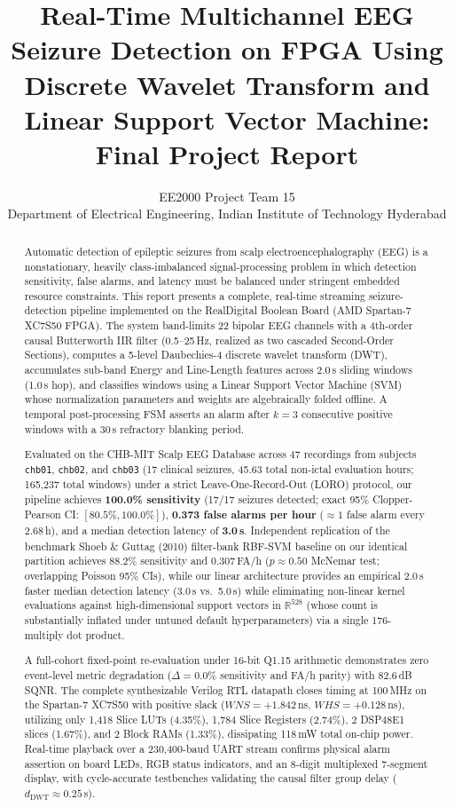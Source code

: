 \documentclass[10pt,twocolumn,letterpaper]{article}
\title{Real-Time Multichannel EEG Seizure Detection on FPGA Using Discrete Wavelet Transform and Linear Support Vector Machine: Final Project Report}
\author{EE2000 Project Team 15\\[2pt]
Department of Electrical Engineering, Indian Institute of Technology Hyderabad}
\begin{document}
\maketitle

\begin{abstract}
Automatic detection of epileptic seizures from scalp electroencephalography (EEG) is a nonstationary, heavily class-imbalanced signal-processing problem in which detection sensitivity, false alarms, and latency must be balanced under stringent embedded resource constraints. This report presents a complete, real-time streaming seizure-detection pipeline implemented on the RealDigital Boolean Board (AMD Spartan-7 XC7S50 FPGA). The system band-limits 22 bipolar EEG channels with a 4th-order causal Butterworth IIR filter (0.5--25\,Hz, realized as two cascaded Second-Order Sections), computes a 5-level Daubechies-4 discrete wavelet transform (DWT), accumulates sub-band Energy and Line-Length features across 2.0\,s sliding windows (1.0\,s hop), and classifies windows using a Linear Support Vector Machine (SVM) whose normalization parameters and weights are algebraically folded offline. A temporal post-processing FSM asserts an alarm after $k=3$ consecutive positive windows with a 30\,s refractory blanking period.

Evaluated on the CHB-MIT Scalp EEG Database across 47 recordings from subjects \texttt{chb01}, \texttt{chb02}, and \texttt{chb03} (17 clinical seizures, 45.63 total non-ictal evaluation hours; 165,237 total windows) under a strict Leave-One-Record-Out (LORO) protocol, our pipeline achieves \textbf{100.0\% sensitivity} (17/17 seizures detected; exact 95\% Clopper-Pearson CI: $[80.5\%, 100.0\%]$), \textbf{0.373 false alarms per hour} ($\approx 1$ false alarm every 2.68\,h), and a median detection latency of \textbf{3.0\,s}. Independent replication of the benchmark Shoeb \& Guttag (2010) filter-bank RBF-SVM baseline on our identical partition achieves 88.2\% sensitivity and 0.307\,FA/h ($p \approx 0.50$ McNemar test; overlapping Poisson 95\% CIs), while our linear architecture provides an empirical 2.0\,s faster median detection latency (3.0\,s vs.\ 5.0\,s) while eliminating non-linear kernel evaluations against high-dimensional support vectors in $\mathbb{R}^{528}$ (whose count is substantially inflated under untuned default hyperparameters) via a single 176-multiply dot product.

A full-cohort fixed-point re-evaluation under 16-bit Q1.15 arithmetic demonstrates zero event-level metric degradation ($\Delta = 0.0\%$ sensitivity and FA/h parity) with 82.6\,dB SQNR. The complete synthesizable Verilog RTL datapath closes timing at 100\,MHz on the Spartan-7 XC7S50 with positive slack ($WNS = +1.842$\,ns, $WHS = +0.128$\,ns), utilizing only 1,418 Slice LUTs (4.35\%), 1,784 Slice Registers (2.74\%), 2 DSP48E1 slices (1.67\%), and 2 Block RAMs (1.33\%), dissipating 118\,mW total on-chip power. Real-time playback over a 230,400-baud UART stream confirms physical alarm assertion on board LEDs, RGB status indicators, and an 8-digit multiplexed 7-segment display, with cycle-accurate testbenches validating the causal filter group delay ($d_{\text{DWT}} \approx 0.25$\,s).


\end{abstract}
\end{document}
